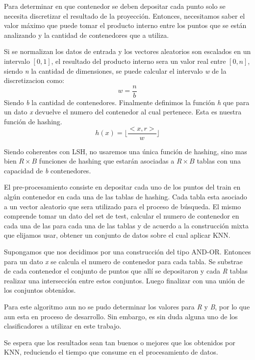 Para determinar en que contenedor se deben depositar cada punto solo se necesita discretizar el resultado de la proyección. Entonces, necesitamos saber el valor máximo que puede tomar el producto interno entre los puntos que se están analizando y la cantidad de contenedores que a utiliza.

Si se normalizan los datos de entrada y los vectores aleatorios son escalados en un intervalo $ [0,1] $, el resultado del producto interno sera un valor real entre $ [0,n] $, siendo \textit{n} la cantidad de dimensiones, se puede calcular el intervalo \textit{w} de la discretizacion como:
\[ w = \frac{n}{b} \]
Siendo \textit{b} la cantidad de contenedores. Finalmente definimos la función \textit{h} que para un dato \textit{x} devuelve el numero del contenedor al cual pertenece. Esta es nuestra función de hashing.
\[ h(x) = \lfloor \frac{<x,r>}{w} \rfloor  \]

Siendo coherentes con LSH, no usaremos una única función de hashing, sino mas bien $ R \times B $ funciones de hashing que estarán asociadas a $ R\times B $ tablas con una capacidad de \textit{b} contenedores.

El pre-procesamiento consiste en depositar cada uno de los puntos del train en algún contenedor en cada una de las tablas de hashing. Cada tabla esta asociado a un vector aleatorio que sera utilizado para el proceso de búsqueda. El mismo comprende tomar un dato del set de test, calcular el numero de contenedor en cada una de las para cada una de las tablas y de acuerdo a la construcción mixta que elijamos usar, obtener un conjunto de datos sobre el cual aplicar KNN. 

Supongamos que nos decidimos por una construcción del tipo AND-OR. Entonces para un dato \textit{x} se calcula el numero de contenedor para cada tabla. Se substrae de cada contenedor el conjunto de puntos que allí se depositaron y cada \textit{R} tablas realizar una intersección entre estos conjuntos. Luego finalizar con una unión de los conjuntos obtenidos.

Para este algoritmo aun no se pudo determinar los valores para \textit{R} y \textit{B}, por lo que aun esta en proceso de desarrollo. Sin embargo, es sin duda alguna uno de los clasificadores a utilizar en este trabajo.

Se espera que los resultados sean tan buenos o mejores que los obtenidos por KNN, reduciendo el tiempo que consume en el procesamiento de datos. 
